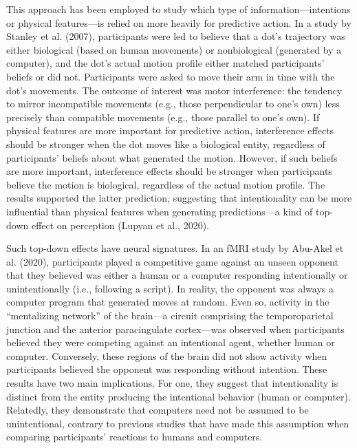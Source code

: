 \documentclass[12pt,twoside]{reedthesis}
\begin{document}
This approach has been employed to study which type of information—intentions or physical features—is relied on more heavily for predictive action. In a study by Stanley et al. (2007), participants were led to believe that a dot’s trajectory was either biological (based on human movements) or nonbiological (generated by a computer), and the dot’s actual motion profile either matched participants’ beliefs or did not. Participants were asked to move their arm in time with the dot’s movements. The outcome of interest was motor interference: the tendency to mirror incompatible movements (e.g., those perpendicular to one’s own) less precisely than compatible movements (e.g., those parallel to one’s own). If physical features are more important for predictive action, interference effects should be stronger when the dot moves like a biological entity, regardless of participants’ beliefs about what generated the motion. However, if such beliefs are more important, interference effects should be stronger when participants believe the motion is biological, regardless of the actual motion profile. The results supported the latter prediction, suggesting that intentionality can be more influential than physical features when generating predictions—a kind of top-down effect on perception (Lupyan et al., 2020). 

Such top-down effects have neural signatures. In an fMRI study by Abu-Akel et al. (2020), participants played a competitive game against an unseen opponent that they believed was either a human or a computer responding intentionally or unintentionally (i.e., following a script). In reality, the opponent was always a computer program that generated moves at random. Even so, activity in the “mentalizing network” of the brain—a circuit comprising the temporoparietal junction and the anterior paracingulate cortex—was observed when participants believed they were competing against an intentional agent, whether human or computer. Conversely, these regions of the brain did not show activity when participants believed the opponent was responding without intention. These results have two main implications. For one, they suggest that intentionality is distinct from the entity producing the intentional behavior (human or computer). Relatedly, they demonstrate that computers need not be assumed to be unintentional, contrary to previous studies that have made this assumption when comparing participants’ reactions to humans and computers.  
\end{document}
